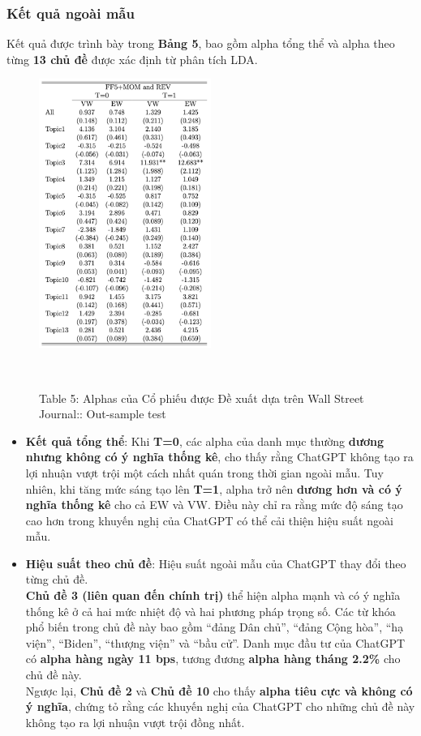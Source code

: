 \documentclass[a4paper,12pt]{article}
\begin{document}
\subsubsection{Kết quả ngoài mẫu}
Kết quả được trình bày trong \textbf{Bảng 5}, bao gồm alpha tổng thể và alpha theo từng \textbf{13 chủ đề} được xác định từ phân tích LDA.
\begin{figure}[H]
    \centering
    \includegraphics[width=0.5\textwidth]{table/tab5.png}
    \caption*{Table 5: Alphas của Cổ phiếu được Đề xuất dựa trên Wall Street Journal:: Out-sample test}
    \
\end{figure}
\begin{itemize}
    \item \textbf{Kết quả tổng thể}: Khi \textbf{T=0}, các alpha của danh mục thường \textbf{dương nhưng không có ý nghĩa thống kê}, cho thấy rằng ChatGPT không tạo ra lợi nhuận vượt trội một cách nhất quán trong thời gian ngoài mẫu. Tuy nhiên, khi tăng mức sáng tạo lên \textbf{T=1}, alpha trở nên \textbf{dương hơn và có ý nghĩa thống kê} cho cả EW và VW. Điều này chỉ ra rằng mức độ sáng tạo cao hơn trong khuyến nghị của ChatGPT có thể cải thiện hiệu suất ngoài mẫu.
    \item \textbf{Hiệu suất theo chủ đề}: Hiệu suất ngoài mẫu của ChatGPT thay đổi theo từng chủ đề. \\
    \textbf{Chủ đề 3 (liên quan đến chính trị)} thể hiện alpha mạnh và có ý nghĩa thống kê ở cả hai mức nhiệt độ và hai phương pháp trọng số. Các từ khóa phổ biến trong chủ đề này bao gồm ``đảng Dân chủ'', ``đảng Cộng hòa'', ``hạ viện'', ``Biden'', ``thượng viện'' và ``bầu cử''. Danh mục đầu tư của ChatGPT có \textbf{alpha hàng ngày 11 bps}, tương đương \textbf{alpha hàng tháng 2.2\%} cho chủ đề này.\\
    Ngược lại, \textbf{Chủ đề 2} và \textbf{Chủ đề 10} cho thấy \textbf{alpha tiêu cực và không có ý nghĩa}, chứng tỏ rằng các khuyến nghị của ChatGPT cho những chủ đề này không tạo ra lợi nhuận vượt trội đồng nhất.
\end{itemize}
\end{document}
